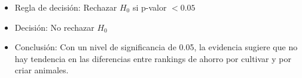 \documentclass[12pt,a4paper]{article}
\begin{document}
\begin{itemize}
    \item Regla de decisión: Rechazar $H_0$ si p-valor $< 0.05$
    \item Decisión: No rechazar $H_0$
    \item Conclusión: Con un nivel de significancia de 0.05, la evidencia sugiere que no hay tendencia en las diferencias entre rankings de ahorro por cultivar y por criar animales.
\end{itemize}
\end{document}
